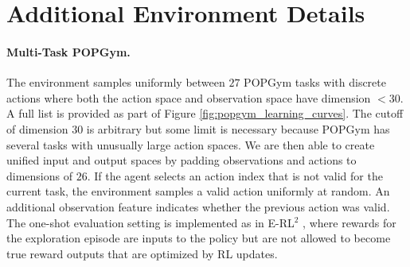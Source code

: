 \documentclass{article}
\begin{document}
\section{Additional Environment Details}
\paragraph{Multi-Task POPGym.} The environment samples uniformly between $27$ POPGym \cite{morad2023popgym} tasks with discrete actions where both the action space and observation space have dimension $< 30$. A full list is provided as part of Figure \ref{fig:popgym_learning_curves}. The cutoff of dimension $30$ is arbitrary but some limit is necessary because POPGym has several tasks with unusually large action spaces. We are then able to create unified input and output spaces by padding observations and actions to dimensions of $26$. If the agent selects an action index that is not valid for the current task, the environment samples a valid action uniformly at random. An additional observation feature indicates whether the previous action was valid. The one-shot evaluation setting is implemented as in E-RL$^2$ \cite{stadie2018some}, where rewards for the exploration episode are inputs to the policy but are not allowed to become true reward outputs that are optimized by RL updates.
\end{document}
